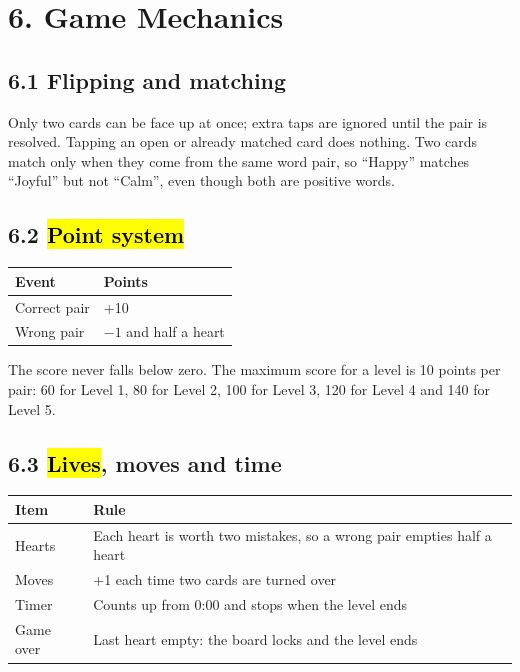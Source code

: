 \documentclass[11pt,a4paper]{article}
\begin{document}
\section{6. Game Mechanics}
\subsection*{6.1 Flipping and matching}
Only two cards can be face up at once; extra taps are ignored until the pair is resolved. Tapping an open or already matched card does nothing. Two cards match only when they come from the same word pair, so ``Happy'' matches ``Joyful'' but not ``Calm'', even though both are positive words.

\subsection*{6.2 \hl{Point system}}
\begin{tabularx}{\textwidth}{|L|L|}
\hline
{}\textbf{Event} & \textbf{Points} \\ \hline
Correct pair & +10 \\ \hline
Wrong pair & $-1$ and half a heart \\ \hline
\end{tabularx}

The score never falls below zero. The maximum score for a level is 10 points per pair: 60 for Level 1, 80 for Level 2, 100 for Level 3, 120 for Level 4 and 140 for Level 5.

\subsection*{6.3 \hl{Lives}, moves and time}
\begin{tabularx}{\textwidth}{|p{3cm}|L|}
\hline
{}\textbf{Item} & \textbf{Rule} \\ \hline
Hearts & Each heart is worth two mistakes, so a wrong pair empties half a heart \\ \hline
Moves & +1 each time two cards are turned over \\ \hline
Timer & Counts up from 0:00 and stops when the level ends \\ \hline
Game over & Last heart empty: the board locks and the level ends \\ \hline
\end{tabularx}
\end{document}
